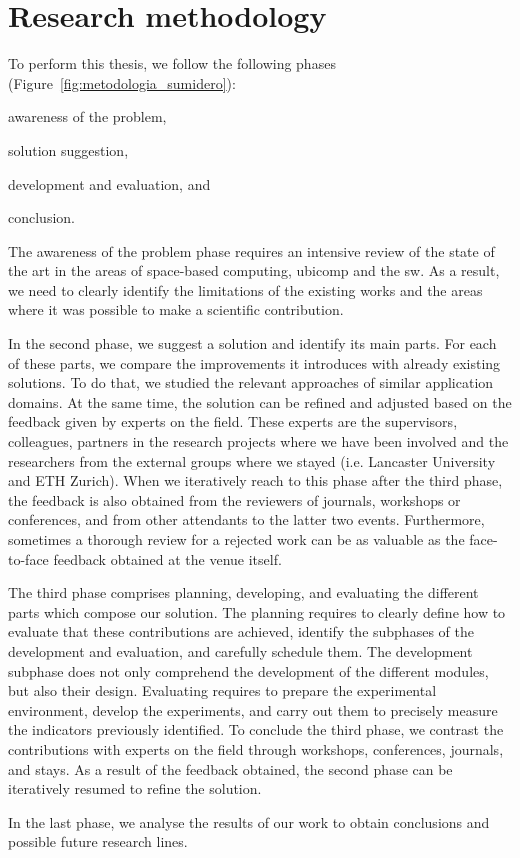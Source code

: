 \section{Research methodology}

To perform this thesis, we follow the following phases (Figure~\ref{fig:metodologia_sumidero}):
\begin{enumerate*}[label=\itshape(\arabic*\upshape)]
  \item awareness of the problem,
  \item solution suggestion,
  \item development and evaluation, and
  \item conclusion.
\end{enumerate*}


The awareness of the problem phase requires an intensive review of the state of the art in the areas of
space-based computing, \acl{ubicomp} and the \acl{sw}.
As a result, we need to clearly identify the limitations of the existing works and the areas where it was possible to make a scientific contribution.


In the second phase, we suggest a solution and identify its main parts.
For each of these parts, we compare the improvements it introduces with already existing solutions.
To do that, we studied the relevant approaches of similar application domains.
At the same time, the solution can be refined and adjusted based on the feedback given by experts on the field.
These experts are the supervisors, colleagues, partners in the research projects where we have been involved and the researchers from the external groups where we stayed (i.e. Lancaster University and ETH Zurich). %
When we iteratively reach to this phase after the third phase, the feedback is also obtained from the reviewers of journals, workshops or conferences, and from other attendants to the latter two events.
Furthermore, sometimes a thorough review for a rejected work can be as valuable as the face-to-face feedback obtained at the venue itself. %


The third phase comprises planning, developing, and evaluating the different parts which compose our solution.
The planning requires to clearly define how to evaluate that these contributions are achieved, identify the subphases of the development and evaluation, and carefully schedule them.
The development subphase does not only comprehend the development of the different modules, but also their design.
Evaluating requires to prepare the experimental environment, develop the experiments, and carry out them to precisely measure the indicators previously identified. %
To conclude the third phase, we contrast the contributions with experts on the field through workshops, conferences, journals, and stays.
As a result of the feedback obtained, the second phase can be iteratively resumed to refine the solution.


In the last phase, we analyse the results of our work to obtain conclusions and possible future research lines.

